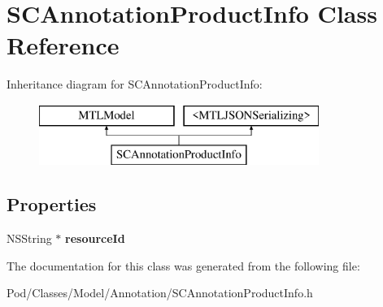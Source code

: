 \hypertarget{interface_s_c_annotation_product_info}{}\section{S\+C\+Annotation\+Product\+Info Class Reference}
\label{interface_s_c_annotation_product_info}
Inheritance diagram for S\+C\+Annotation\+Product\+Info\+:\begin{figure}[H]
\begin{center}
\leavevmode
\includegraphics[height=2.000000cm]{interface_s_c_annotation_product_info}
\end{center}
\end{figure}
\subsection*{Properties}
\begin{DoxyCompactItemize}
\item 
N\+S\+String $\ast$ {\bfseries resource\+Id}\hypertarget{interface_s_c_annotation_product_info_a4ebe9b4bd6bbe2cf44a8ab50f932fff1}{}\label{interface_s_c_annotation_product_info_a4ebe9b4bd6bbe2cf44a8ab50f932fff1}

\end{DoxyCompactItemize}


The documentation for this class was generated from the following file\+:\begin{DoxyCompactItemize}
\item 
Pod/\+Classes/\+Model/\+Annotation/S\+C\+Annotation\+Product\+Info.\+h\end{DoxyCompactItemize}
